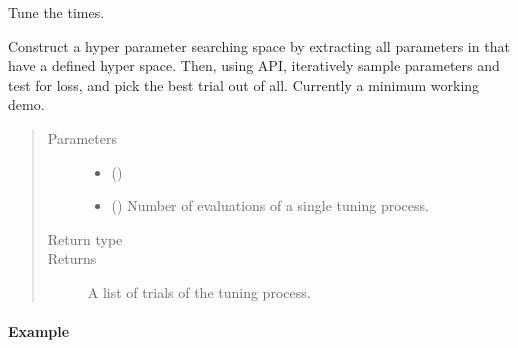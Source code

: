 \documentclass[letterpaper,10pt,english]{sphinxmanual}
\begin{document}
\begin{fulllineitems}
\label{\detokenize{matchzoo.engine:matchzoo.engine.tune.tune}}
Tune the   times.

Construct a hyper parameter searching space by extracting all parameters
in  that have a defined hyper space. Then, using  API,
iteratively sample parameters and test for loss, and pick the best trial
out of all. Currently a minimum working demo.
\begin{quote}\begin{description}
\item[{Parameters}] \leavevmode\begin{itemize}
\item {} 
 ({\hyperref[\detokenize{matchzoo.engine:matchzoo.engine.base_model.BaseModel}]{}}) \textendash{} 

\item {} 
 () \textendash{} Number of evaluations of a single tuning process.

\end{itemize}

\item[{Return type}] \leavevmode
{}

\item[{Returns}] \leavevmode
A list of trials of the tuning process.

\end{description}\end{quote}
\paragraph{Example}

%
\begin{sphinxVerbatim}[commandchars=\\\{\}]
   
  
  
   
  
\end{sphinxVerbatim}

\end{fulllineitems}
\end{document}
